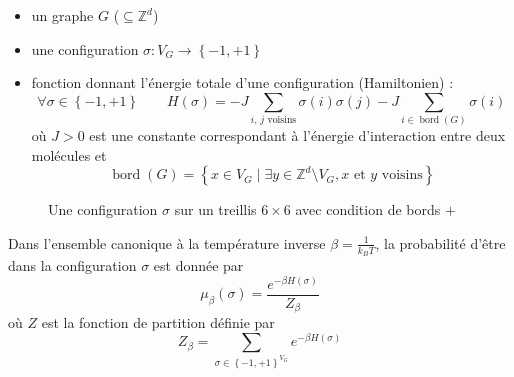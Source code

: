 \documentclass[french]{beamer}
\DeclareMathOperator{\bord}{bord}
\begin{document}
\begin{frame}
    \begin{itemize}
        \item un graphe \(G\) (\(\subseteq \mathbb{Z}^d\))
        \item une configuration \(\sigma : V_G \to \left\{-1, +1\right\} \)
        \item fonction donnant l'énergie totale d'une configuration (Hamiltonien) :
        \[
        \forall \sigma \in \left\{-1, +1\right\} \qquad H(\sigma) = - J \sum_\text{$i$, $j$ voisins} \sigma(i)\sigma(j)
                 - J \sum_{i \in \bord(G)} \sigma(i)
        \]
        où \(J > 0\) est une constante correspondant à l'énergie d'interaction entre deux molécules et
        \[
        \bord(G) = \left\{x \in V_G \mid \exists y \in \mathbb{Z}^d\setminus V_G, \text{$x$ et $y$ voisins} \right\}
        \]
    \end{itemize}
\end{frame}




\begin{frame}
\begin{figure}
    \centering
    \caption{Une configuration $\sigma$ sur un treillis $6\times6$ avec condition de bords $+$}
\end{figure}
\end{frame}

\begin{frame}
    \begin{definition}
    Dans l'ensemble canonique à la température inverse $\beta = \frac{1}{k_BT}$, la probabilité d'être dans la configuration \(\sigma\)  est donnée par
        \[\mu_\beta(\sigma) = \frac{e^ { - \beta H(\sigma)}}{Z_\beta} \]
        où $Z$ est la fonction de partition définie par \[Z_\beta = \sum_{\sigma \in \left\{-1, +1\right\}^{V_G}} e^{-\beta H(\sigma)}\]
    \end{definition}
\end{frame}
\end{document}
